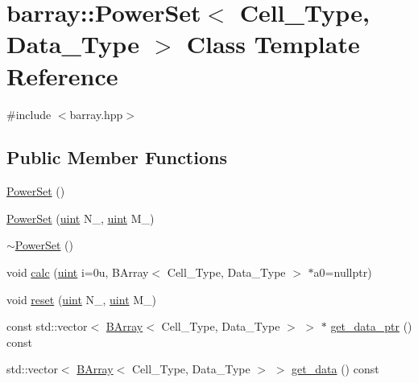 \hypertarget{classbarray_1_1_power_set}{}\section{barray\+:\+:Power\+Set$<$ Cell\+\_\+\+Type, Data\+\_\+\+Type $>$ Class Template Reference}
\label{classbarray_1_1_power_set}


{\ttfamily \#include $<$barray.\+hpp$>$}

\subsection*{Public Member Functions}
\begin{DoxyCompactItemize}
\item 
\hyperlink{classbarray_1_1_power_set_abcdc2405c2bbcad64bc1cd39cb0569ad}{Power\+Set} ()
\item 
\hyperlink{classbarray_1_1_power_set_a27260fc29e88af115702af0b060a1015}{Power\+Set} (\hyperlink{namespacebarray_af9756a31953db233f80a9cfe1ef31c32}{uint} N\+\_\+, \hyperlink{namespacebarray_af9756a31953db233f80a9cfe1ef31c32}{uint} M\+\_\+)
\item 
\hyperlink{classbarray_1_1_power_set_ac1c4670f4f8920f0a9b1123045a75830}{$\sim$\+Power\+Set} ()
\item 
void \hyperlink{classbarray_1_1_power_set_a93e31ba8891642db6ecf0fca82c71f6a}{calc} (\hyperlink{namespacebarray_af9756a31953db233f80a9cfe1ef31c32}{uint} i=0u, B\+Array$<$ Cell\+\_\+\+Type, Data\+\_\+\+Type $>$ $\ast$a0=nullptr)
\item 
void \hyperlink{classbarray_1_1_power_set_a8074f5a6d44b6b7f6bad56d15576eb9f}{reset} (\hyperlink{namespacebarray_af9756a31953db233f80a9cfe1ef31c32}{uint} N\+\_\+, \hyperlink{namespacebarray_af9756a31953db233f80a9cfe1ef31c32}{uint} M\+\_\+)
\item 
const std\+::vector$<$ \hyperlink{classbarray_1_1_b_array}{B\+Array}$<$ Cell\+\_\+\+Type, Data\+\_\+\+Type $>$ $>$ $\ast$ \hyperlink{classbarray_1_1_power_set_aeca18986c92b68a865b54e0d7a89ea75}{get\+\_\+data\+\_\+ptr} () const
\item 
std\+::vector$<$ \hyperlink{classbarray_1_1_b_array}{B\+Array}$<$ Cell\+\_\+\+Type, Data\+\_\+\+Type $>$ $>$ \hyperlink{classbarray_1_1_power_set_a22265b4a46c95e35f8739d076d5763ba}{get\+\_\+data} () const
\end{DoxyCompactItemize}
